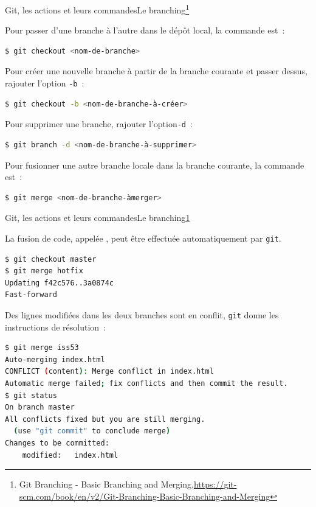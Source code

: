 \documentclass{beamer}
\begin{document}
    \begin{frame}[fragile]{Git, les actions et leurs commandes}{Le branching\footnote{\label{progitmerge}Git Branching - Basic Branching and Merging,\url{https://git-scm.com/book/en/v2/Git-Branching-Basic-Branching-and-Merging}}}
        \transdissolve

        Pour passer d'une branche à l'autre dans le dépôt local, la commande est~:
        \begin{lstlisting}[language=sh]
$ git checkout <nom-de-branche>
        \end{lstlisting}

        Pour créer une nouvelle branche à partir de la branche courante et passer dessus, rajouter l'option \lstinline{-b}~:
        \begin{lstlisting}[language=sh]
$ git checkout -b <nom-de-branche-à-créer>
        \end{lstlisting}

        Pour supprimer une branche, rajouter l'option\lstinline{-d}~:
        \begin{lstlisting}[language=sh]
$ git branch -d <nom-de-branche-à-supprimer>
        \end{lstlisting}

        Pour fusionner une autre branche locale dans la branche courante, la commande est~:
        \begin{lstlisting}[language=sh]
$ git merge <nom-de-branche-àmerger>
        \end{lstlisting}
    \end{frame}

    \begin{frame}[fragile]{Git, les actions et leurs commandes}{Le branching\cref{progitmerge}}
        \transdissolve

        La fusion de code, appelée , peut être effectuée automatiquement par \lstinline{git}.
        \begin{lstlisting}[language=sh]
$ git checkout master
$ git merge hotfix
Updating f42c576..3a0874c
Fast-forward
        \end{lstlisting}

        Des lignes modifiées dans les deux branches sont en conflit, \lstinline{git} donne les instructions de résolution~:
        \begin{lstlisting}[language=sh]
$ git merge iss53
Auto-merging index.html
CONFLICT (content): Merge conflict in index.html
Automatic merge failed; fix conflicts and then commit the result.
$ git status
On branch master
All conflicts fixed but you are still merging.
  (use "git commit" to conclude merge)
Changes to be committed:
    modified:   index.html
        \end{lstlisting}
    \end{frame}
\end{document}
